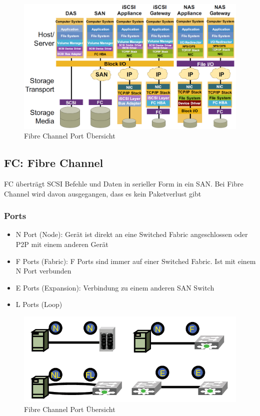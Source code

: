 \begin{figure}[h]
	\centering
	\includegraphics[width=0.7\linewidth]{images/storage_overview}
	\caption{Fibre Channel Port Übersicht}
\end{figure}

\subsection{FC: Fibre Channel}
FC überträgt SCSI Befehle und Daten in serieller Form in ein SAN. Bei Fibre Channel wird davon ausgegangen, dass es kein Paketverlust gibt

\subsubsection{Ports}
\begin{itemize}
	\item N Port (Node): Gerät ist direkt an eine Switched Fabric angeschlossen oder P2P mit einem anderen Gerät
	\item F Ports (Fabric): F Ports sind immer auf einer Switched Fabric. Ist mit einem N Port verbunden
	\item E Ports (Expansion): Verbindung zu einem anderen SAN Switch
	\item L Ports (Loop)
\end{itemize}

\begin{figure}[h]
	\centering
	\includegraphics[width=0.5\linewidth]{images/fc_ports}
	\caption{Fibre Channel Port Übersicht}
\end{figure}


